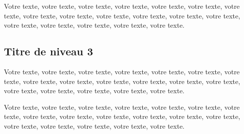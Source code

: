 Votre texte, votre texte, votre texte, votre texte, votre texte, votre texte, votre texte, votre texte, votre texte, votre texte, votre texte, votre texte, votre texte, votre texte, votre texte, votre texte, votre texte, votre texte.


\subsection{Titre de niveau 3}

Votre texte, votre texte, votre texte, votre texte, votre texte, votre texte, votre texte, votre texte, votre texte, votre texte, votre texte, votre texte, votre texte, votre texte, votre texte, votre texte, votre texte, votre texte.

Votre texte, votre texte, votre texte, votre texte, votre texte, votre texte, votre texte, votre texte, votre texte, votre texte, votre texte, votre texte, votre texte, votre texte, votre texte, votre texte, votre texte, votre texte.